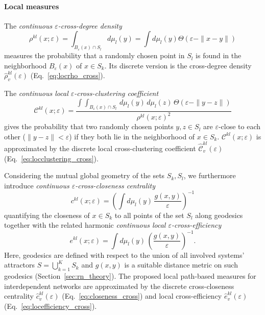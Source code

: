 

\paragraph{Local measures}

The \emph{continuous $\varepsilon$-cross-degree density}
\begin{equation}
\rho^{kl}(x;\varepsilon) = \int_{B_\varepsilon(x) \cap S_l} d\mu_l(y) = \int d\mu_l(y) \Theta(\varepsilon - \|x-y\|)
\end{equation}
\noindent
measures the probability that a randomly chosen point in $S_l$ is found in the neighborhood $B_\varepsilon(x)$ of $x\in S_k$. Its discrete version is the cross-degree density $\hat{\rho}_v^{kl}(\varepsilon)$ (Eq.~\ref{eq:locrho_cross}).

The \emph{continuous local $\varepsilon$-cross-clustering coefficient}
\begin{equation}
\mathcal{C}^{kl}(x;\varepsilon) = \frac{\int\!\!\!\int_{B_\varepsilon(x) \cap S_l} \,d\mu_l(y)\,d\mu_l(z)\, \Theta(\varepsilon-\|y-z\|)}{\rho^{kl}(x;\varepsilon)^2}
\end{equation}
gives the probability that two randomly chosen points $y,z\in S_l$ are $\varepsilon$-close to each other ($\|y-z\|<\varepsilon$) if they both lie in the neighborhood of $x\in S_k$. $\mathcal{C}^{kl}(x;\varepsilon)$ is approximated by the discrete local cross-clustering coefficient $\hat{\mathcal{C}}_v^{kl}(\varepsilon)$ (Eq.~\ref{eq:locclustering_cross}).

Considering the mutual global geometry of the sets $S_k,S_l$, we furthermore introduce \textit{continuous $\varepsilon$-cross-closeness centrality}
\begin{equation}
c^{kl}(x;\varepsilon) = \left( \int d\mu_l(y) \, \frac{g(x,y)}{\varepsilon} \right)^{-1}
\end{equation}
quantifying the closeness of $x\in S_k$ to all points of the set $S_l$ along geodesics together with the related harmonic \textit{continuous local $\varepsilon$-cross-efficiency}
\begin{equation}
e^{kl}(x;\varepsilon) = \int d\mu_l(y) \, \left( \frac{g(x,y)}{\varepsilon} \right)^{-1}.
\end{equation}
Here, geodesics are defined with respect to the union of all involved systems' attractors $S=\bigcup_{k=1}^K S_k$ and $g(x,y)$ is a suitable distance metric on such geodesics (Section~\ref{sec:rn_theory}). The proposed local path-based measures for interdependent networks are approximated by the discrete cross-closeness centrality $\hat{c}_v^{kl}(\varepsilon)$ (Eq.~\ref{eq:closeness_cross}) and local cross-efficiency $\hat{e}_v^{kl}(\varepsilon)$ (Eq.~\ref{eq:locefficiency_cross}). 


